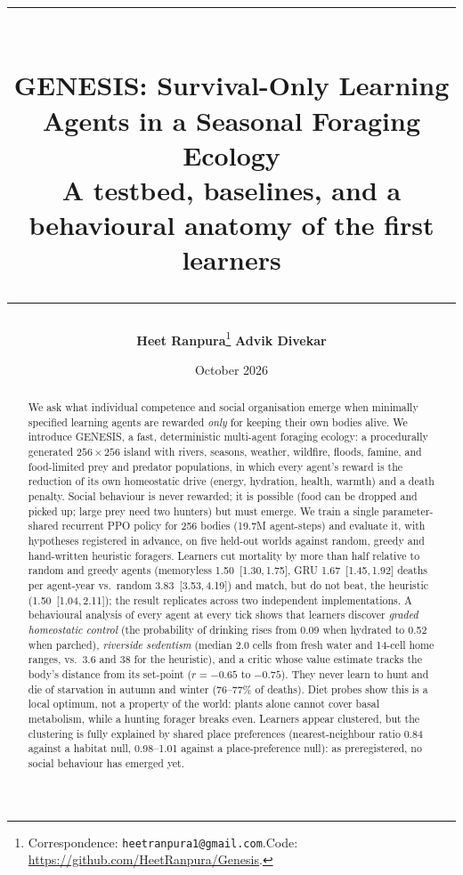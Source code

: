 \documentclass[10pt]{article}
\title{\vspace{-0.4in}\rule{\textwidth}{3pt}\\[6pt]
\textbf{GENESIS: Survival-Only Learning Agents in a Seasonal Foraging Ecology}\\[2pt]
\large A testbed, baselines, and a behavioural anatomy of the first learners\\[-2pt]
\rule{\textwidth}{1pt}}
\author{%
  \textbf{Heet Ranpura}\thanks{Correspondence: \texttt{heetranpura1@gmail.com}.\quad Code: \url{https://github.com/HeetRanpura/Genesis}.}
  \qquad \textbf{Advik Divekar}}
\date{October 2026}
\newcommand{\ci}[3]{#1~\mbox{[#2,\,#3]}}
\begin{document}
\maketitle

\begin{abstract}
We ask what individual competence and social organisation emerge when minimally specified learning agents are
rewarded \emph{only} for keeping their own bodies alive. We introduce GENESIS, a fast, deterministic multi-agent
foraging ecology: a procedurally generated $256{\times}256$ island with rivers, seasons, weather, wildfire, floods,
famine, and food-limited prey and predator populations, in which every agent's reward is the reduction of its own
homeostatic drive (energy, hydration, health, warmth) and a death penalty. Social behaviour is never rewarded; it is
possible (food can be dropped and picked up; large prey need two hunters) but must emerge. We train a single
parameter-shared recurrent PPO policy for 256 bodies (19.7M agent-steps) and evaluate it, with hypotheses registered
in advance, on five held-out worlds against random, greedy and hand-written heuristic foragers. Learners cut
mortality by more than half relative to random and greedy agents (memoryless \ci{1.50}{1.30}{1.75},
GRU \ci{1.67}{1.45}{1.92} deaths per agent-year vs.\ random \ci{3.83}{3.53}{4.19}) and match, but do not beat, the
heuristic (\ci{1.50}{1.04}{2.11}); the result replicates across two independent implementations. A behavioural
analysis of every agent at every tick shows that learners discover \emph{graded homeostatic control} (the
probability of drinking rises from 0.09 when hydrated to 0.52 when parched), \emph{riverside sedentism} (median
2.0 cells from fresh water and 14-cell home ranges, vs.\ 3.6 and 38 for the heuristic), and a critic whose value
estimate tracks the body's distance from its set-point ($r=-0.65$ to $-0.75$). They never learn to hunt and die of
starvation in autumn and winter (76--77\% of deaths). Diet probes show this is a local optimum, not a property of the
world: plants alone cannot cover basal metabolism, while a hunting forager breaks even. Learners appear clustered,
but the clustering is fully explained by shared place preferences (nearest-neighbour ratio 0.84 against a habitat
null, 0.98--1.01 against a place-preference null): as preregistered, no social behaviour has emerged yet.
\end{abstract}
\end{document}
